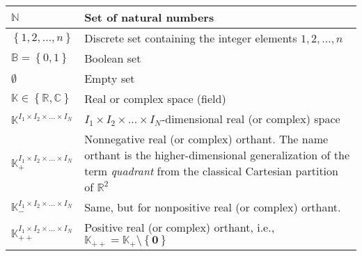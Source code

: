 \begin{xltabular}{\textwidth}{XX}
	\(\mathbb{N}\)                                             & Set of natural numbers                                                                                                                             \\ \hline
	\(\left\{ 1,2, \dots, n \right\}\)                         & Discrete set containing the integer elements \(1,2, \dots, n\)                                                                                     \\ \hline
	\(\mathbb{B} = \left\{ 0, 1 \right\}\)                     & Boolean set                                                                                                                                        \\ \hline %
	\(\emptyset\)                                              & Empty set                                                                                                                                          \\ \hline
	\(\mathbb{K} \in \left\{ \mathbb{R}, \mathbb{C} \right\}\) & Real or complex space (field)                                                                                                                      \\ \hline
	\(\mathbb{K}^{I_1\times I_2 \times \dots \times I_N}\)     & \(I_1\times I_2 \times \dots \times I_N\)-dimensional real (or complex) space                                                                      \\ \hline
	\(\mathbb{K}_{+}^{I_1\times I_2 \times \dots \times I_N}\) \cite{boydConvexOptimization2004} \cite[sec. 2.1.3]{dattorroConvexOptimizationEuclidean2010}                                         & Nonnegative real (or complex) orthant. The name orthant is the higher-dimensional generalization of the term \emph{quadrant} from the classical Cartesian partition of \(\mathbb{R}^{2}\) \cite[sec 2.1.3]{dattorroConvexOptimizationEuclidean2010} \\ \hline
	\(\mathbb{K}_{-}^{I_1\times I_2 \times \dots \times I_N}\) \cite{boydConvexOptimization2004} \cite[sec. 2.1.3]{dattorroConvexOptimizationEuclidean2010}                                         & Same, but for nonpositive real (or complex) orthant. \\ \hline
	\(\mathbb{K}_{++}^{I_1\times I_2 \times \dots \times I_N}\)                                        & Positive real (or complex) orthant, i.e., \(\mathbb{K}_{++} = \mathbb{K}_{+}\setminus\left\{ \mathbf{0} \right\}\) \cite{boydConvexOptimization2004} \\ \hline

\end{xltabular}
